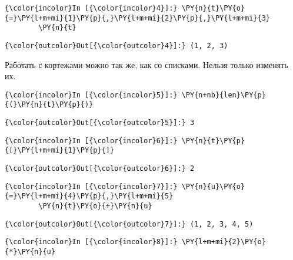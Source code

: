     \begin{Verbatim}[commandchars=\\\{\}]
{\color{incolor}In [{\color{incolor}4}]:} \PY{n}{t}\PY{o}{=}\PY{l+m+mi}{1}\PY{p}{,}\PY{l+m+mi}{2}\PY{p}{,}\PY{l+m+mi}{3}
        \PY{n}{t}
\end{Verbatim}

            \begin{Verbatim}[commandchars=\\\{\}]
{\color{outcolor}Out[{\color{outcolor}4}]:} (1, 2, 3)
\end{Verbatim}
        
    Работать с кортежами можно так же, как со списками. Нельзя только
изменять их.

    \begin{Verbatim}[commandchars=\\\{\}]
{\color{incolor}In [{\color{incolor}5}]:} \PY{n+nb}{len}\PY{p}{(}\PY{n}{t}\PY{p}{)}
\end{Verbatim}

            \begin{Verbatim}[commandchars=\\\{\}]
{\color{outcolor}Out[{\color{outcolor}5}]:} 3
\end{Verbatim}
        
    \begin{Verbatim}[commandchars=\\\{\}]
{\color{incolor}In [{\color{incolor}6}]:} \PY{n}{t}\PY{p}{[}\PY{l+m+mi}{1}\PY{p}{]}
\end{Verbatim}

            \begin{Verbatim}[commandchars=\\\{\}]
{\color{outcolor}Out[{\color{outcolor}6}]:} 2
\end{Verbatim}
        
    \begin{Verbatim}[commandchars=\\\{\}]
{\color{incolor}In [{\color{incolor}7}]:} \PY{n}{u}\PY{o}{=}\PY{l+m+mi}{4}\PY{p}{,}\PY{l+m+mi}{5}
        \PY{n}{t}\PY{o}{+}\PY{n}{u}
\end{Verbatim}

            \begin{Verbatim}[commandchars=\\\{\}]
{\color{outcolor}Out[{\color{outcolor}7}]:} (1, 2, 3, 4, 5)
\end{Verbatim}
        
    \begin{Verbatim}[commandchars=\\\{\}]
{\color{incolor}In [{\color{incolor}8}]:} \PY{l+m+mi}{2}\PY{o}{*}\PY{n}{u}
\end{Verbatim}


